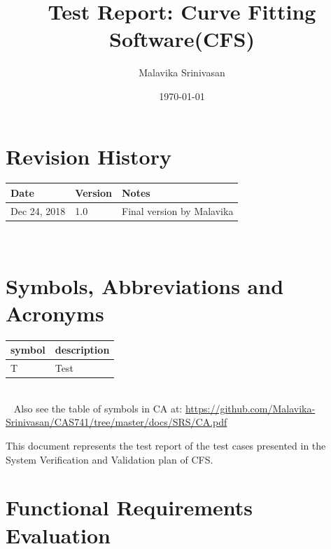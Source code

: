 \documentclass[12pt, titlepage]{article}
\newcommand{\famname}{CFS}
\begin{document}
\title{Test Report: Curve Fitting Software(CFS)} 
\author{Malavika Srinivasan}
\date{\today}
	
\maketitle


\section{Revision History}

\begin{tabularx}{\textwidth}{p{3cm}p{2cm}X}
\toprule {\bf Date} & {\bf Version} & {\bf Notes}\\
\midrule
Dec 24, 2018 & 1.0 & Final version by Malavika \\
\bottomrule
\end{tabularx}

~\newpage

\section{Symbols, Abbreviations and Acronyms}

\renewcommand{\arraystretch}{1.2}
\begin{tabular}{l l} 
  \toprule		
  \textbf{symbol} & \textbf{description}\\
  \midrule 
  T & Test\\
  \bottomrule
\end{tabular}\\
~\newline
Also see the table of symbols in CA at: 
\url{https://github.com/Malavika-Srinivasan/CAS741/tree/master/docs/SRS/CA.pdf}\\



\newpage

\tableofcontents

\listoftables %

\listoffigures %

\newpage


This document represents the test report of the test cases presented in 
the System Verification and Validation plan of \famname{}.

\section{Functional Requirements Evaluation}
\end{document}
